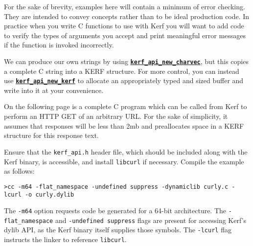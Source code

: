 \documentclass{article}
\newcommand{\ffi}[2]{\hyperref[ffi:#2]{\textbf{\texttt{#1}}}}
\begin{document}
For the sake of brevity, examples here will contain a minimum of error checking. They are intended to convey concepts rather than to be ideal production code. In practice when you write C functions to use with Kerf you will want to add code to verify the types of arguments you accept and print meaningful error messages if the function is invoked incorrectly.

\vspace{0.5cm}

We can produce our own strings by using \ffi{kerf\_api\_new\_charvec}{kerfApiNewCharvec}, but this copies a complete C string into a KERF structure. For more control, you can instead use \ffi{kerf\_api\_new\_kerf}{kerfApiNewKerf} to allocate an appropriately typed and sized buffer and write into it at your convenience.

\vspace{0.5cm}

On the following page is a complete C program which can be called from Kerf to perform an HTTP GET of an arbitrary URL. For the sake of simplicity, it assumes that responses will be less than 2mb and preallocates space in a KERF structure for this response text.

\vspace{0.5cm}

Ensure that the \texttt{kerf\_api.h} header file, which should be included along with the Kerf binary, is accessible, and install \texttt{libcurl} if necessary. Compile the example as follows:

\begin{Verbatim}
>cc -m64 -flat_namespace -undefined suppress -dynamiclib curly.c -lcurl -o curly.dylib
\end{Verbatim}

The \texttt{-m64} option requests code be generated for a 64-bit architecture. The \texttt{-flat\_namespace} and \texttt{-undefined suppress} flags are present for accessing Kerf's dylib API, as the Kerf binary itself supplies those symbols. The \texttt{-lcurl} flag instructs the linker to reference \texttt{libcurl}.
\end{document}
